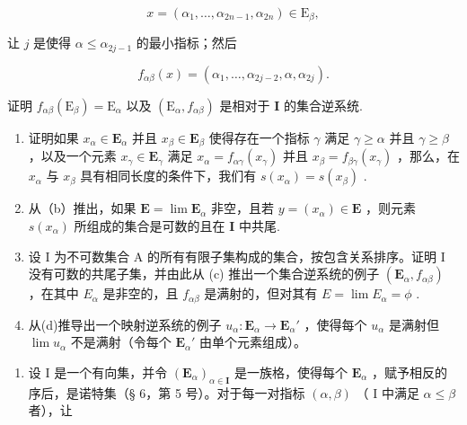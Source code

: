 \[
x = \left(\alpha_ {1}, \dots , \alpha_ {2 n - 1}, \alpha_ {2 n}\right) \in \mathrm{E} _ {\beta},
\]

让 \(j\) 是使得 \(\alpha \leqslant \alpha_{2j - 1}\) 的最小指标；然后

\[
f _ {\alpha \beta} (x) = (\alpha_ {1}, \dots , \alpha_ {2 j - 2}, \alpha , \alpha_ {2 j}).
\]

证明 \(f_{\alpha \beta}(\mathrm{E}_{\beta}) = \mathrm{E}_{\alpha}\) 以及 \((\mathrm{E}_{\alpha}, f_{\alpha \beta})\) 是相对于 \(\mathbf{I}\) 的集合逆系统.

\begin{enumerate}
\def\labelenumi{(\alph{enumi})}
\setcounter{enumi}{1}
\item
  证明如果 \(x_{\alpha} \in \mathbf{E}_{\alpha}\) 并且 \(x_{\beta} \in \mathbf{E}_{\beta}\) 使得存在一个指标 \(\gamma\) 满足 \(\gamma \geqslant \alpha\) 并且 \(\gamma \geqslant \beta\) ，以及一个元素 \(x_{\gamma} \in \mathbf{E}_{\gamma}\) 满足 \(x_{\alpha} = f_{\alpha \gamma}(x_{\gamma})\) 并且 \(x_{\beta} = f_{\beta \gamma}(x_{\gamma})\) ，那么，在 \(x_{\alpha}\) 与 \(x_{\beta}\) 具有相同长度的条件下，我们有 \(s(x_{\alpha}) = s(x_{\beta})\) .
\item
  从（b）推出，如果 \(\mathbf{E} = \lim \mathbf{E}_{\alpha}\) 非空，且若 \(y = (x_{\alpha}) \in \mathbf{E}\) ，则元素 \(s(x_{\alpha})\) 所组成的集合是可数的且在 \(\mathbf{I}\) 中共尾.
\item
  设 I 为不可数集合 A 的所有有限子集构成的集合，按包含关系排序。证明 I 没有可数的共尾子集，并由此从 (c) 推出一个集合逆系统的例子 \((\mathbf{E}_{\alpha}, f_{\alpha\beta})\) ，在其中 \(E_{\alpha}\) 是非空的，且 \(f_{\alpha\beta}\) 是满射的，但对其有 \(E = \lim E_{\alpha} = \phi\) .
\item
  从(d)推导出一个映射逆系统的例子 \(u_{\alpha}: \mathbf{E}_{\alpha} \to \mathbf{E}_{\alpha}'\) ，使得每个 \(u_{\alpha}\) 是满射但 \(\lim u_{\alpha}\) 不是满射（令每个 \(\mathbf{E}_{\alpha}'\) 由单个元素组成）。
\end{enumerate}

\begin{enumerate}
\def\labelenumi{\arabic{enumi}.}
\setcounter{enumi}{4}
\tightlist
\item
  设 I 是一个有向集，并令 \((\mathbf{E}_{\alpha})_{\alpha \in \mathbf{I}}\) 是一族格，使得每个 \(\mathbf{E}_{\alpha}\) ，赋予相反的序后，是诺特集（§ 6，第 5 号）。对于每一对指标 \((\alpha, \beta)\) （ I 中满足 \(\alpha \leqslant \beta\) 者），让
\end{enumerate}

